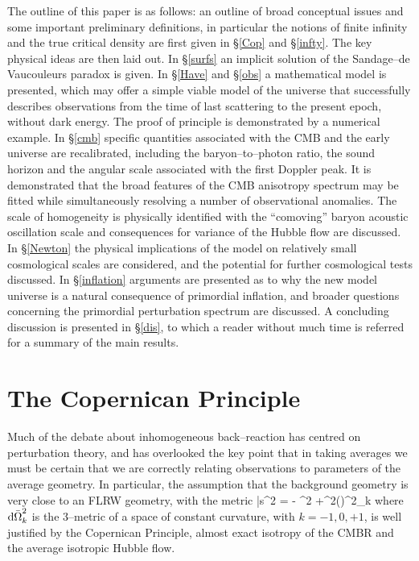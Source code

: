 \documentclass[12pt]{article}
\begin{document}
The outline of this paper is as follows: an outline of broad conceptual
issues and some important preliminary definitions, in particular the notions
of finite infinity and the true critical density are first given in
\S\ref{Cop} and \S\ref{infty}. The key physical ideas are then laid out.
In \S\ref{surfs} an implicit solution of the Sandage--de Vaucouleurs paradox
is given. In \S\ref{Have} and \S\ref{obs} a mathematical model is
presented, which may offer a simple viable model of the universe
that successfully describes observations from the time of last
scattering to the present epoch, without dark energy. The proof of
principle is demonstrated by a numerical example. In \S\ref{cmb}
specific quantities associated with the CMB and the early universe are
recalibrated, including the baryon--to--photon ratio, the sound horizon
and the angular scale associated with the first Doppler peak. It is
demonstrated that the broad features of the CMB anisotropy spectrum
may be fitted while simultaneously resolving a number of observational
anomalies. The scale of homogeneity is physically identified with the
``comoving'' baryon acoustic oscillation scale and consequences for variance of
the Hubble flow are discussed. In \S\ref{Newton}
the physical implications of the model on relatively small cosmological
scales are considered, and the potential for further cosmological tests
discussed. In \S\ref{inflation} arguments are presented as to why the
new model universe is a natural consequence of primordial inflation,
and broader questions concerning the
primordial perturbation spectrum are discussed. A concluding discussion
is presented in \S\ref{dis}, to which a reader without much time is referred
for a summary of the main results.

\section{The Copernican Principle\label{Cop}}

Much of the debate about inhomogeneous back--reaction has centred on
perturbation theory, and has overlooked the key point that in taking
averages we must be certain that we are correctly relating
observations to parameters of the average geometry. In particular,
the assumption that the background geometry is very close to an FLRW
geometry, with the metric
\beq\label{FLRW}
\dd\bar s^2 = - \dd\ts^2 +\ab^2(\ts)\dd\OM^2_{k}
\eeq
where $\dd\OM^2_{k}$ is the 3--metric of a space of constant curvature,
with $k=-1,0,+1$, is well justified by the Copernican Principle, almost
exact isotropy of the CMBR and the average isotropic Hubble flow.
\end{document}
